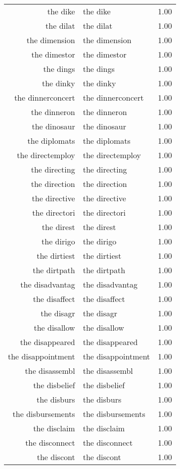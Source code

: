 \begin{table}[ht]
\begin{tabular}{rlr}
  the dike & the dike & 1.00 \\ 
  the dilat & the dilat & 1.00 \\ 
  the dimension & the dimension & 1.00 \\ 
  the dimestor & the dimestor & 1.00 \\ 
  the dings & the dings & 1.00 \\ 
  the dinky & the dinky & 1.00 \\ 
  the dinnerconcert & the dinnerconcert & 1.00 \\ 
  the dinneron & the dinneron & 1.00 \\ 
  the dinosaur & the dinosaur & 1.00 \\ 
  the diplomats & the diplomats & 1.00 \\ 
  the directemploy & the directemploy & 1.00 \\ 
  the directing & the directing & 1.00 \\ 
  the direction & the direction & 1.00 \\ 
  the directive & the directive & 1.00 \\ 
  the directori & the directori & 1.00 \\ 
  the direst & the direst & 1.00 \\ 
  the dirigo & the dirigo & 1.00 \\ 
  the dirtiest & the dirtiest & 1.00 \\ 
  the dirtpath & the dirtpath & 1.00 \\ 
  the disadvantag & the disadvantag & 1.00 \\ 
  the disaffect & the disaffect & 1.00 \\ 
  the disagr & the disagr & 1.00 \\ 
  the disallow & the disallow & 1.00 \\ 
  the disappeared & the disappeared & 1.00 \\ 
  the disappointment & the disappointment & 1.00 \\ 
  the disassembl & the disassembl & 1.00 \\ 
  the disbelief & the disbelief & 1.00 \\ 
  the disburs & the disburs & 1.00 \\ 
  the disbursements & the disbursements & 1.00 \\ 
  the disclaim & the disclaim & 1.00 \\ 
  the disconnect & the disconnect & 1.00 \\ 
  the discont & the discont & 1.00 \\ 

\end{tabular}
\end{table}
